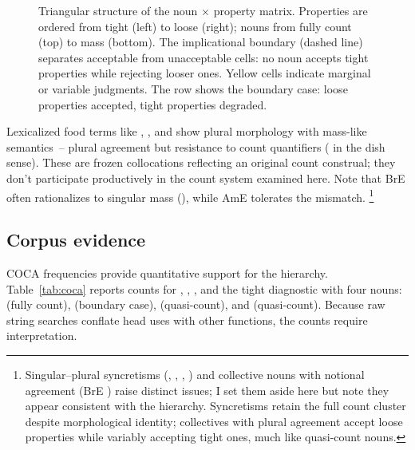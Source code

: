 \documentclass[12pt,a4paper]{article}
\begin{document}
\begin{figure}[t]
\caption{Triangular structure of the noun $\times$ property matrix. Properties are ordered from tight (left) to loose (right); nouns from fully count (top) to mass (bottom). The implicational boundary (dashed line) separates acceptable from unacceptable cells: no noun accepts tight properties while rejecting looser ones. Yellow cells indicate marginal or variable judgments. The  row shows the boundary case: loose properties accepted, tight properties degraded.}
\label{fig:heatmap}
\end{figure}

Lexicalized food terms like , , and  show plural morphology with mass-like semantics~-- plural agreement but resistance to count quantifiers ( in the dish sense). These are frozen collocations reflecting an original count construal; they don't participate productively in the count system examined here. Note that BrE often rationalizes to singular mass (), while AmE tolerates the mismatch.%
\footnote{Singular--plural syncretisms (, , , ) and collective nouns with notional agreement (BrE ) raise distinct issues; I set them aside here but note they appear consistent with the hierarchy. Syncretisms retain the full count cluster despite morphological identity; collectives with plural agreement accept loose properties while variably accepting tight ones, much like quasi-count nouns.}


\subsection{Corpus evidence}\label{sec:corpus}

COCA frequencies provide quantitative support for the hierarchy. Table~\ref{tab:coca} reports counts for , , , and the tight diagnostic  with four nouns:  (fully count),  (boundary case),  (quasi-count), and  (quasi-count). Because raw string searches conflate head uses with other functions, the counts require interpretation.
\end{document}
